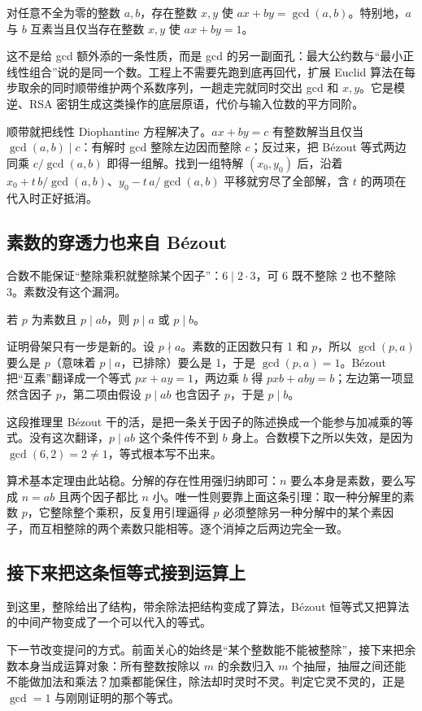 \begin{theorem}
对任意不全为零的整数 \(a,b\)，存在整数 \(x,y\) 使 \(ax+by=\gcd(a,b)\)。特别地，\(a\) 与 \(b\) 互素当且仅当存在整数 \(x,y\) 使 \(ax+by=1\)。
\end{theorem}

这不是给 gcd 额外添的一条性质，而是 gcd 的另一副面孔：最大公约数与``最小正线性组合''说的是同一个数。工程上不需要先跑到底再回代，扩展 Euclid 算法在每步取余的同时顺带维护两个系数序列，一趟走完就同时交出 gcd 和 \(x,y\)。它是模逆、RSA 密钥生成这类操作的底层原语，代价与输入位数的平方同阶。

顺带就把线性 Diophantine 方程解决了。\(ax+by=c\) 有整数解当且仅当 \(\gcd(a,b)\mid c\)：有解时 gcd 整除左边因而整除 \(c\)；反过来，把 Bézout 等式两边同乘 \(c/\gcd(a,b)\) 即得一组解。找到一组特解 \((x_0,y_0)\) 后，沿着 \(x_0+t\,b/\gcd(a,b)\)、\(y_0-t\,a/\gcd(a,b)\) 平移就穷尽了全部解，含 \(t\) 的两项在代入时正好抵消。

\subsection{素数的穿透力也来自 Bézout}

合数不能保证``整除乘积就整除某个因子''：\(6\mid 2\cdot3\)，可 6 既不整除 2 也不整除 3。素数没有这个漏洞。

\begin{lemma}[Euclid 引理]
若 \(p\) 为素数且 \(p\mid ab\)，则 \(p\mid a\) 或 \(p\mid b\)。
\end{lemma}

证明骨架只有一步是新的。设 \(p\nmid a\)。素数的正因数只有 1 和 \(p\)，所以 \(\gcd(p,a)\) 要么是 \(p\)（意味着 \(p\mid a\)，已排除）要么是 1，于是 \(\gcd(p,a)=1\)。Bézout 把``互素''翻译成一个等式 \(px+ay=1\)，两边乘 \(b\) 得 \(pxb+aby=b\)；左边第一项显然含因子 \(p\)，第二项由假设 \(p\mid ab\) 也含因子 \(p\)，于是 \(p\mid b\)。

这段推理里 Bézout 干的活，是把一条关于因子的陈述换成一个能参与加减乘的等式。没有这次翻译，\(p\mid ab\) 这个条件传不到 \(b\) 身上。合数模下之所以失效，是因为 \(\gcd(6,2)=2\neq1\)，等式根本写不出来。

算术基本定理由此站稳。分解的存在性用强归纳即可：\(n\) 要么本身是素数，要么写成 \(n=ab\) 且两个因子都比 \(n\) 小。唯一性则要靠上面这条引理：取一种分解里的素数 \(p\)，它整除整个乘积，反复用引理逼得 \(p\) 必须整除另一种分解中的某个素因子，而互相整除的两个素数只能相等。逐个消掉之后两边完全一致。

\subsection{接下来把这条恒等式接到运算上}

到这里，整除给出了结构，带余除法把结构变成了算法，Bézout 恒等式又把算法的中间产物变成了一个可以代入的等式。

下一节改变提问的方式。前面关心的始终是``某个整数能不能被整除''，接下来把余数本身当成运算对象：所有整数按除以 \(m\) 的余数归入 \(m\) 个抽屉，抽屉之间还能不能做加法和乘法？加乘都能保住，除法却时灵时不灵。判定它灵不灵的，正是 \(\gcd=1\) 与刚刚证明的那个等式。
